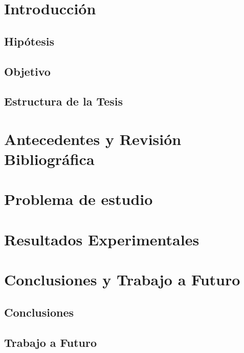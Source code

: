 \chapter{Introducción}



\section{Hipótesis}



\section{Objetivo}



\section{Estructura de la Tesis}



\chapter{Antecedentes y Revisión Bibliográfica}


\chapter{Problema de estudio}


\chapter{Resultados Experimentales}



\chapter{Conclusiones y Trabajo a Futuro}



\section{Conclusiones}



\section{Trabajo a Futuro}

